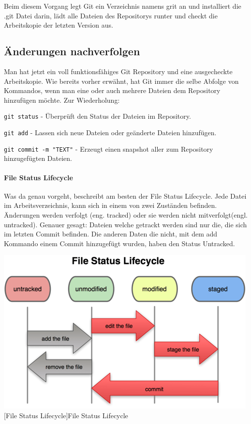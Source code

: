 \documentclass[12pt,a4paper,bibliography=totocnumbered,listof=totocnumbered]{scrartcl}
\begin{document}
Beim diesem Vorgang legt Git ein Verzeichnis namens grit an und installiert die .git Datei darin, lädt alle Dateien des Repositorys runter und checkt die Arbeitskopie der letzten Version aus.




\subsection{Änderungen nachverfolgen}
Man hat jetzt ein voll funktionsfähiges Git Repository und eine ausgecheckte Arbeitskopie.  Wie bereits vorher erwähnt, hat Git immer die selbe Abfolge von Kommandos, wenn man eine oder auch mehrere Dateien dem Repository hinzufügen möchte. Zur Wiederholung:

\begin{compactitem}
	\item \lstinline|git status| - Überprüft den Status der Dateien im Repository.
	\item \lstinline|git add| - Lassen sich neue Dateien oder geänderte Dateien hinzufügen. 
	\item \lstinline|git commit -m "TEXT"| - Erzeugt einen snapshot aller zum Repository hinzugefügten Dateien.
\end{compactitem}

\paragraph{File Status Lifecycle}
Was da genau vorgeht, beschreibt am besten der File Status Lifecycle. Jede Datei im Arbeitsverzeichnis, kann sich in einem von zwei Zuständen befinden. Änderungen werden verfolgt (eng. tracked) oder sie werden nicht mitverfolgt(engl. untracked). 
Genauer gesagt: Dateien welche getrackt werden sind nur die, die sich im letzten Commit befinden. Die anderen Daten die nicht, mit dem add Kommando einem Commit hinzugefügt wurden, haben den Status Untracked. \newline


\newline
\newline
\vspace{1em}
\begin{minipage}{\linewidth}
	\centering
	\includegraphics[width=0.6\linewidth]{Bilder/flc.png}
	[File Status Lifecycle]{File Status Lifecycle\footnotemark }
	\label{File Status Lifecycle}
\end{minipage} 	
\end{document}
